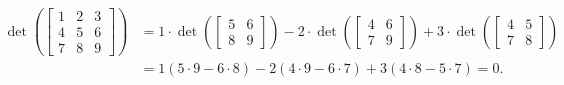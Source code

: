 \documentclass{ximera}
\begin{document}
\begin{equation*}
    \begin{split}
        \det \left(
            \begin{bmatrix}
                1 & 2 & 3 \\
                4 & 5 & 6 \\
                7 & 8 & 9
            \end{bmatrix}
        \right)
        & = 1 \cdot
        \det \left(
        \begin{bmatrix}
            5 & 6 \\
            8 & 9
        \end{bmatrix}
        \right)
        - 2 \cdot \det 
        \left(
            \begin{bmatrix}
                4 & 6 \\
                7 & 9
            \end{bmatrix}
        \right)
        + 3 \cdot \det 
        \left(
            \begin{bmatrix}
                4 & 5 \\
                7 & 8
            \end{bmatrix}
        \right) \\
        & = 1 (5 \cdot 9 - 6 \cdot 8) - 2 (4 \cdot 9 - 6 \cdot 7) + 3 (4 \cdot 8 - 5 \cdot 7) = 0 .
    \end{split}
\end{equation*}
\end{document}
